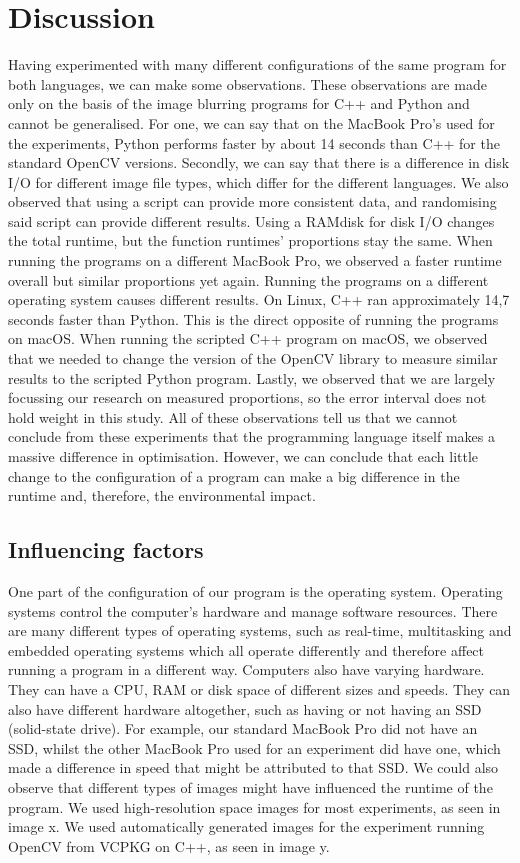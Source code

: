 \chapter{Discussion}
Having experimented with many different configurations of the same program for both languages, we can make some observations. These observations are made only on the basis of the image blurring programs for C++ and Python and cannot be generalised.
For one, we can say that on the MacBook Pro’s used for the experiments, Python performs faster by about 14 seconds than C++ for the standard OpenCV versions. Secondly, we can say that there is a difference in disk I/O for different image file types, which differ for the different languages. We also observed that using a script can provide more consistent data, and randomising said script can provide different results. Using a RAMdisk for disk I/O changes the total runtime, but the function runtimes' proportions stay the same. When running the programs on a different MacBook Pro, we observed a faster runtime overall but similar proportions yet again. Running the programs on a different operating system causes different results. On Linux, C++ ran approximately 14,7 seconds faster than Python. This is the direct opposite of running the programs on macOS. When running the scripted C++ program on macOS, we observed that we needed to change the version of the OpenCV library to measure similar results to the scripted Python program. Lastly, we observed that we are largely focussing our research on measured proportions, so the error interval does not hold weight in this study.
All of these observations tell us that we cannot conclude from these experiments that the programming language itself makes a massive difference in optimisation. However, we can conclude that each little change to the configuration of a program can make a big difference in the runtime and, therefore, the environmental impact.

\section{Influencing factors}
One part of the configuration of our program is the operating system. Operating systems control the computer’s hardware and manage software resources. There are many different types of operating systems, such as real-time, multitasking and embedded operating systems which all operate differently and therefore affect running a program in a different way.
Computers also have varying hardware. They can have a CPU, RAM or disk space of different sizes and speeds. They can also have different hardware altogether, such as having or not having an SSD (solid-state drive). For example, our standard MacBook Pro did not have an SSD, whilst the other MacBook Pro used for an experiment did have one, which made a difference in speed that might be attributed to that SSD.
We could also observe that different types of images might have influenced the runtime of the program. We used high-resolution space images for most experiments, as seen in image x. We used automatically generated images for the experiment running OpenCV from VCPKG on C++, as seen in image y.

